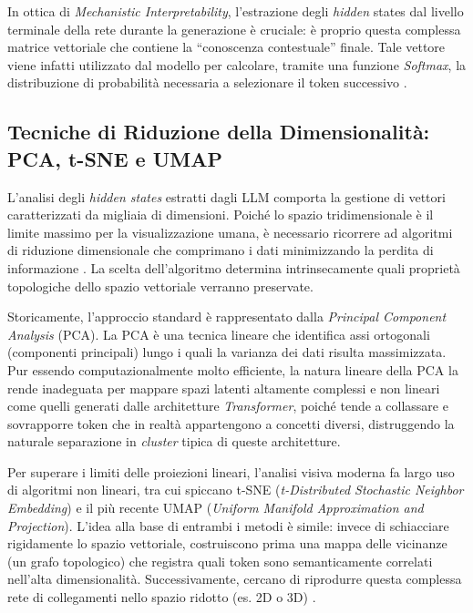 In ottica di \textit{Mechanistic Interpretability}, l'estrazione degli \textit{hidden} states dal livello terminale della rete durante la generazione è cruciale: è proprio questa complessa matrice vettoriale che contiene la ``conoscenza contestuale'' finale. Tale vettore viene infatti utilizzato dal modello per calcolare, tramite una funzione \textit{Softmax}, la distribuzione di probabilità necessaria a selezionare il token successivo \cite{vaswani2017attention}.

\subsection{Tecniche di Riduzione della Dimensionalità: PCA, t-SNE e UMAP}
\label{sec:riduzione_dimensionalita}

L'analisi degli \textit{hidden states} estratti dagli LLM comporta la gestione di vettori caratterizzati da migliaia di dimensioni. Poiché lo spazio tridimensionale è il limite massimo per la visualizzazione umana, è necessario ricorrere ad algoritmi di riduzione dimensionale che comprimano i dati minimizzando la perdita di informazione \cite{mcinnes2018umap}. La scelta dell'algoritmo determina intrinsecamente quali proprietà topologiche dello spazio vettoriale verranno preservate.

Storicamente, l'approccio standard è rappresentato dalla \textit{Principal Component Analysis} (PCA). La PCA è una tecnica lineare che identifica assi ortogonali (componenti principali) lungo i quali la varianza dei dati risulta massimizzata. Pur essendo computazionalmente molto efficiente, la natura lineare della PCA la rende inadeguata per mappare spazi latenti altamente complessi e non lineari come quelli generati dalle architetture \textit{Transformer}, poiché tende a collassare e sovrapporre token che in realtà appartengono a concetti diversi, distruggendo la naturale separazione in \textit{cluster} tipica di queste architetture.

Per superare i limiti delle proiezioni lineari, l'analisi visiva moderna fa largo uso di algoritmi non lineari, tra cui spiccano t-SNE (\textit{t-Distributed Stochastic Neighbor Embedding}) e il più recente UMAP (\textit{Uniform Manifold Approximation and Projection}). L'idea alla base di entrambi i metodi è simile: invece di schiacciare rigidamente lo spazio vettoriale, costruiscono prima una mappa delle vicinanze (un grafo topologico) che registra quali token sono semanticamente correlati nell'alta dimensionalità. Successivamente, cercano di riprodurre questa complessa rete di collegamenti nello spazio ridotto (es. 2D o 3D) \cite{mcinnes2018umap}.

